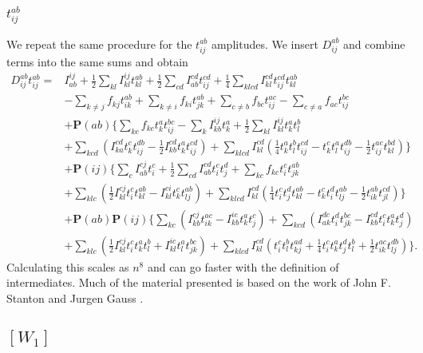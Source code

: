 \documentclass[a4paper,norsk,11pt,twoside]{report}
\begin{document}
\subsubsection{$t_{ij}^{ab}$}
We repeat the same procedure for the $t_{ij}^{ab}$ amplitudes. We
insert $D_{ij}^{ab}$ and combine terms into the same sums and obtain
\begin{align}
D_{ij}^{ab} t_{ij}^{ab} = & 
I_{ab}^{ij}
+ \frac{1}{2} \sum_{kl} I_{kl}^{ij} t_{kl}^{ab} 
+ \frac{1}{2} \sum_{cd} I_{ab}^{cd} t_{ij}^{cd}
+ \frac{1}{4} \sum_{klcd} I_{kl}^{cd}
t_{ij}^{cd} t_{kl}^{ab} 
 \nonumber \\ &
- \sum_{k \not= j} f_{kj} t_{ik}^{ab} 
+ \sum_{k \not= i} f_{ki} t_{jk}^{ab}
+ \sum_{c \not= b} f_{bc} t_{ij}^{ac}
- \sum_{c \not= a} f_{ac} t_{ij}^{bc}
 \nonumber \\ &
+ \textbf{P}(ab) 
\{
\sum_{kc} f_{kc} t_k^a t_{ij}^{bc}
- \sum_k I_{kb}^{ij} t_k^a
+ \frac{1}{2} \sum_{kl} I_{kl}^{ij} t_k^a t_l^b 
\nonumber \\ &
+ \sum_{kcd} 
(
I_{ka}^{cd} t_k^c t_{ij}^{db} 
- \frac{1}{2} I_{kb}^{cd} t_k^a t_{ij}^{cd} 
)
+ \sum_{klcd} I_{kl}^{cd} (\frac{1}{4} t_k^a t_l^b t_{ij}^{cd} - t_k^c t_l^a t_{ij}^{db} - \frac{1}{2} t_{ij}^{ac} t_{kl}^{bd})
\}
\nonumber \\ &
+ \textbf{P}(ij)
\{
\sum_c I_{ab}^{cj} t_i^c
+ \frac{1}{2} \sum_{cd} I_{ab}^{cd} t_i^c t_j^d 
+ \sum_{kc} f_{kc} t_i^c t_{jk}^{ab}
\nonumber \\ &
+ \sum_{klc}
( 
\frac{1}{2} 
I_{kl}^{cj} t_i^c t_{kl}^{ab}
- I_{kl}^{ci} t_k^c t_{lj}^{ab}
)
+ \sum_{klcd} I_{kl}^{cd}
(
\frac{1}{4} t_i^c t_j^d t_{kl}^{ab} 
- t_k^c t_i^d t_{lj}^{ab} 
- \frac{1}{2} t_{ik}^{ab} t_{jl}^{cd}
)
\}
\nonumber \\ &
+ \textbf{P}(ab) \textbf{P}(ij)
\{
\sum_{kc}
(
I_{kb}^{cj} t_{ik}^{ac}
- I_{kb}^{ic} t_k^a t_j^c
)
+ \sum_{kcd}
(
I_{ak}^{dc} t_i^d t_{jk}^{bc}
- I_{kb}^{cd} t_i^c t_k^a t_j^d
)
\nonumber \\ &
+ \sum_{klc}
(
\frac{1}{2} I_{kl}^{cj} t_i^c t_k^a t_l^b
+ I_{kl}^{ic} t_l^a t_{jk}^{bc}
)
+ \sum_{klcd} I_{kl}^{cd}
(
t_i^c t_l^b t_{kj}^{ad}
+ \frac{1}{4} t_i^c t_k^a t_j^d t_l^b
+ \frac{1}{2} t_{ik}^{ac} t_{lj}^{db} 
)
\} . 
\end{align}
Calculating this scales as $n^8$ and can go faster with the definition of intermediates. Much of the material presented is based on the work of John F. Stanton and Jurgen Gauss \cite{ccsd_fac1}.

\subsection{$[W_1]$}
\end{document}
